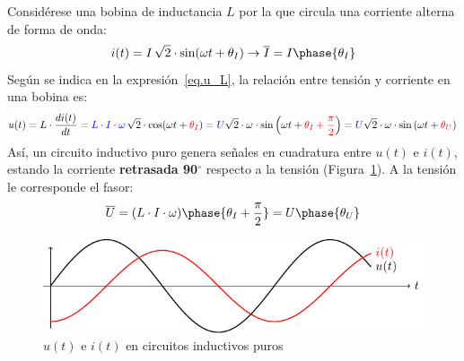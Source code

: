 	Considérese una bobina de inductancia $L$ por la que circula una corriente alterna de forma de onda:
	\begin{equation*}
		i(t)=I\,\sqrt{2}\cdot\sin(\omega t+\theta_I)\rightarrow\overline{I}=I\phase{\theta_I}
	\end{equation*}
	Según se indica en la expresión~\eqref{eq.u_L}, la relación entre tensión y corriente en una bobina es: 
	\begin{equation*}
		u(t)=L\cdot\dfrac{di(t)}{dt}={\color{blue}L\cdot I \cdot \omega}\,\sqrt{2}\cdot  \cos(\omega t+{\color{red}\theta_I})= {\color{blue} U} \sqrt{2}\cdot \omega\cdot  \sin \left(\omega t+{\color{red}\theta_I+\frac{\pi}{2}}\right)= {\color{blue} U} \sqrt{2}\cdot \omega\cdot  \sin \left(\omega t+{\color{red}\theta_U}\right)\,
	\end{equation*}
	Así, un circuito inductivo puro genera señales en cuadratura entre $u(t)$ e $i(t)$, estando la corriente \textbf{retrasada 90$^\circ$} respecto a la tensión (Figura~\ref{fig.inductivoPuro}). A la tensión le corresponde el fasor:
	\begin{equation*}
		\overline{U}=(L\cdot I\cdot\omega)\phase{\theta_I+\frac{\pi}{2}}=U\phase{\theta_U}
	\end{equation*}
	\begin{figure}[H]
		\centering
		\includegraphics{../figs/inductivoPuro.pdf}
		\caption{$u(t)$ e $i(t)$ en circuitos inductivos puros}
		\label{fig.inductivoPuro}
	\end{figure}
	
